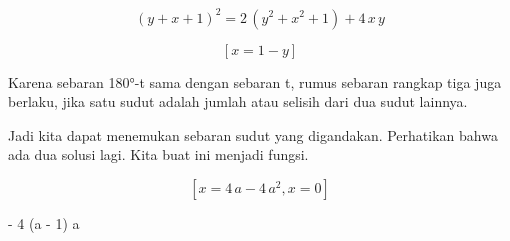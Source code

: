 \documentclass[a4paper,10pt]{article}
\begin{document}
\begin{eulernotebook}
\begin{eulercomment}
\begin{eulercomment}
\begin{eulercomment}
\begin{eulercomment}
\begin{eulercomment}
\begin{eulercomment}
\begin{eulercomment}
\begin{eulercomment}
\begin{eulercomment}
\begin{eulercomment}
\begin{eulercomment}
\begin{eulercomment}
\begin{eulercomment}
\begin{eulercomment}
\begin{eulercomment}
\begin{eulercomment}
\begin{eulercomment}
\begin{eulercomment}
\begin{eulercomment}
\begin{eulercomment}
\begin{eulercomment}
\begin{eulercomment}
\begin{eulercomment}
\begin{eulercomment}
\begin{eulercomment}
\begin{eulercomment}
\begin{eulercomment}
\begin{eulercomment}
\begin{eulercomment}
\begin{eulercomment}
\begin{eulercomment}
\begin{eulercomment}
\begin{eulerformula}
\[
\left(y+x+1\right)^2=2\,\left(y^2+x^2+1\right)+4\,x\,y
\]
\end{eulerformula}
\begin{eulerformula}
\[
\left[ x=1-y \right] 
\]
\end{eulerformula}
\begin{eulercomment}
Karena sebaran 180°-t sama dengan sebaran t, rumus sebaran rangkap
tiga juga berlaku, jika satu sudut adalah jumlah atau selisih dari dua
sudut lainnya.

Jadi kita dapat menemukan sebaran sudut yang digandakan. Perhatikan
bahwa ada dua solusi lagi. Kita buat ini menjadi fungsi.
\end{eulercomment}
\begin{eulerformula}
\[
\left[ x=4\,a-4\,a^2 , x=0 \right] 
\]
\end{eulerformula}
\begin{euleroutput}
  
                              - 4 (a - 1) a
  

\end{euleroutput}
\end{eulercomment}
\end{eulercomment}
\end{eulercomment}
\end{eulercomment}
\end{eulercomment}
\end{eulercomment}
\end{eulercomment}
\end{eulercomment}
\end{eulercomment}
\end{eulercomment}
\end{eulercomment}
\end{eulercomment}
\end{eulercomment}
\end{eulercomment}
\end{eulercomment}
\end{eulercomment}
\end{eulercomment}
\end{eulercomment}
\end{eulercomment}
\end{eulercomment}
\end{eulercomment}
\end{eulercomment}
\end{eulercomment}
\end{eulercomment}
\end{eulercomment}
\end{eulercomment}
\end{eulercomment}
\end{eulercomment}
\end{eulercomment}
\end{eulercomment}
\end{eulercomment}
\end{eulercomment}
\end{eulernotebook}
\end{document}
